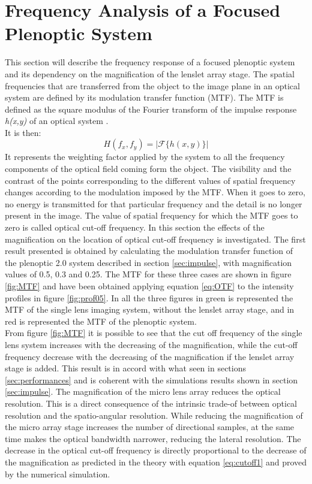 \section{Frequency Analysis of a Focused Plenoptic System}
\label{sec:freq}
This section will describe the frequency response of a focused plenoptic system and its dependency on the magnification of the lenslet array stage. The spatial frequencies that are transferred from the object to the image plane in an optical system are defined by its modulation transfer function (MTF). The MTF is defined as the square modulus of the Fourier transform of the impulse response \textit{h(x,y)} of an optical system \cite{goodman2005introduction}. \\
It is then:
\begin{equation}
	\label{eq:OTF}
	H(f_x,f_y) = |\mathcal{F}\{h(x,y)\}|
\end{equation}
It represents the weighting factor applied by the system to all the frequency components of the optical field coming form the object. The visibility and the contrast of the points corresponding to the different values of spatial frequency changes according to the modulation imposed by the MTF. When it goes to zero, no energy is transmitted for that particular frequency and the detail is no longer present in the image.
The value of spatial frequency  for which the MTF goes to zero is called optical cut-off frequency. In this section the effects of the magnification on the location of optical cut-off frequency is investigated. The first result presented is obtained by calculating the modulation transfer function of the plenoptic 2.0 system described in section \ref{sec:impulse}, with magnification values of 0.5, 0.3 and 0.25. The MTF for these three cases are shown in figure \ref{fig:MTF} and have been obtained applying equation \ref{eq:OTF} to the intensity profiles in figure \ref{fig:prof05}. In all the three figures in green is represented the MTF of the single lens imaging system, without the lenslet array stage, and in red is represented the MTF of the plenoptic system.\\
From figure \ref{fig:MTF} it is possible to see that the cut off frequency of the single lens system increases with the decreasing of the magnification, while the cut-off frequency decrease with the decreasing of the magnification if the lenslet array stage is added. This result is in accord with what seen in sections \ref{sec:performances} and is coherent with the simulations results shown in section \ref{sec:impulse}. The magnification of the micro lens array reduces the optical resolution. This is a direct consequence of the intrinsic trade-of between optical resolution and the spatio-angular resolution. While reducing the magnification of the micro array stage increases the number of directional samples, at the same time makes the optical bandwidth narrower, reducing the lateral resolution. The decrease in the optical cut-off frequency is directly proportional to the decrease of the magnification as predicted in the theory with equation \ref{eq:cutoff1} and proved by the numerical simulation. 
